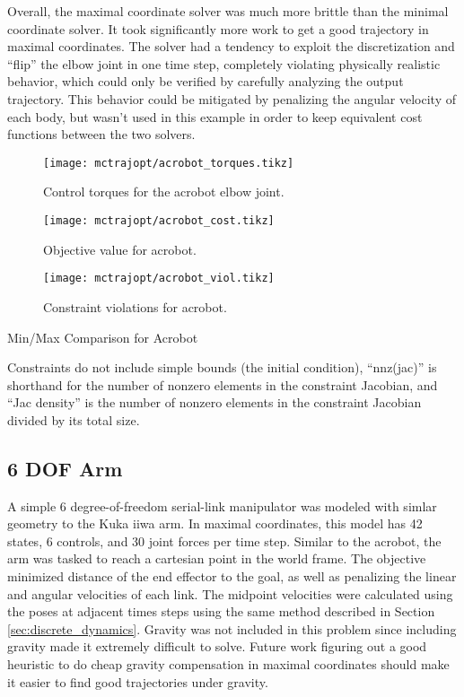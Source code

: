 \documentclass[../root.tex]{subfiles}
\begin{document}
Overall, the maximal coordinate solver was much more brittle than the minimal coordinate 
solver. It took significantly more work to get a good trajectory in maximal coordinates. 
The solver had a tendency to exploit the discretization and ``flip'' the elbow joint in 
one time step, completely violating physically realistic behavior, which could only be 
verified by carefully analyzing the output trajectory. This behavior could be mitigated by 
penalizing the angular velocity of each body, but wasn't used in this example in order to 
keep equivalent cost functions between the two solvers.

\begin{figure}
    \centering
    \texttt{[image: mctrajopt/acrobot\_torques.tikz]}
    \caption{Control torques for the acrobot elbow joint.}
    \label{fig:acrobot_torques}
\end{figure}
\begin{figure}
    \centering
    \texttt{[image: mctrajopt/acrobot\_cost.tikz]}
    \caption{Objective value for acrobot.}
    \label{fig:acrobot_cost}
\end{figure}
\begin{figure}
    \centering
    \texttt{[image: mctrajopt/acrobot\_viol.tikz]}
    \caption{Constraint violations for acrobot.}
    \label{fig:acrobot_viol}
\end{figure}

\begin{table}
    \centering 
    \caption{Min/Max Comparison for Acrobot}
    
    \caption*{ \small
        Constraints do not include simple bounds (the initial condition), ``nnz(jac)'' 
        is shorthand for the number of nonzero elements in the constraint Jacobian, and 
        ``Jac density'' is the number of nonzero elements in the constraint Jacobian 
        divided by its total size.
    }
    \label{tab:acrobot}
\end{table}


\subsection{6 DOF Arm}
A simple 6 degree-of-freedom serial-link manipulator was modeled with simlar geometry to the
Kuka iiwa arm. In maximal coordinates, this model has 42 states, 6 controls, and 30 joint 
forces per time step. Similar to the acrobot, the arm was tasked to reach a cartesian point
in the world frame. The objective minimized distance of the end effector to the goal, as 
well as penalizing the linear and angular velocities of each link. The midpoint velocities 
were calculated using the poses at adjacent times steps using the same method described in 
Section \ref{sec:discrete_dynamics}. Gravity was not included in this problem since 
including gravity made it extremely difficult to solve. Future work figuring out a good 
heuristic to do cheap gravity compensation in maximal coordinates should make it easier to
find good trajectories under gravity. 
\end{document}
